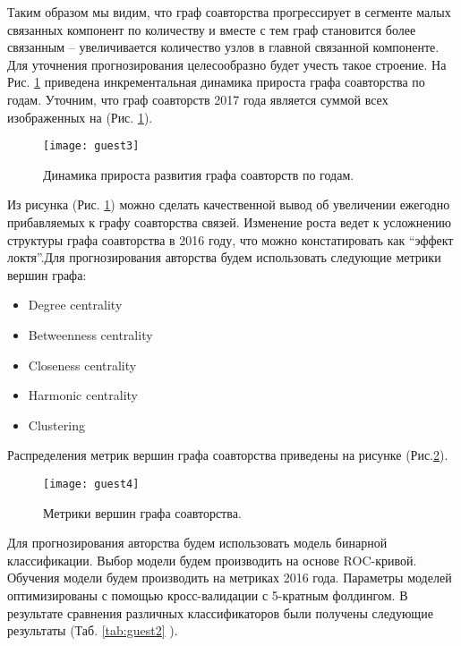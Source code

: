 Таким образом мы видим, что граф соавторства прогрессирует в сегменте малых связанных компонент по количеству и вместе с тем граф становится более связанным – увеличивается количество узлов в главной связанной компоненте. Для уточнения прогнозирования целесообразно будет учесть такое строение. 
На Рис. \ref{fig:guest3} приведена инкрементальная динамика прироста графа соавторства по годам. Уточним, что граф соавторств 2017 года является суммой всех изображенных на (Рис. \ref{fig:guest3}).

\begin{figure}[H]
  \caption{Динамика прироста развития графа соавторств по годам.}
  \centering
    \texttt{[image: guest3]}
  \label{fig:guest3}
\end{figure}  

Из рисунка (Рис. \ref{fig:guest3}) можно сделать качественной вывод об увеличении ежегодно прибавляемых к графу соавторства связей. Изменение роста ведет к усложнению структуры графа соавторства в 2016 году, что можно констатировать как ``эффект локтя''.Для прогнозирования авторства будем использовать следующие метрики вершин графа:
\begin{itemize}
\tightlist
\item Degree centrality
\item Betweenness centrality
\item Closeness centrality
\item Harmonic centrality
\item Clustering
\end{itemize}

Распределения метрик вершин графа соавторства приведены на рисунке (Рис.\ref{fig:guest4}).

\begin{figure}[H]
  \caption{Метрики вершин графа соавторства.}
  \centering
    \texttt{[image: guest4]}
  \label{fig:guest4}
\end{figure}  

Для прогнозирования авторства будем использовать модель бинарной классификации. Выбор модели будем производить на основе ROC-кривой. Обучения модели будем производить на метриках 2016 года. Параметры моделей оптимизированы с помощью кросс-валидации с 5-кратным фолдингом. В результате сравнения различных классификаторов были получены следующие результаты (Таб. \ref{tab:guest2} ).

\begin{table}[H]
\centering
\caption{Сравнение классификаторов по метрике ROC AUC.}
\label{tab:guest2}
\end{table}

